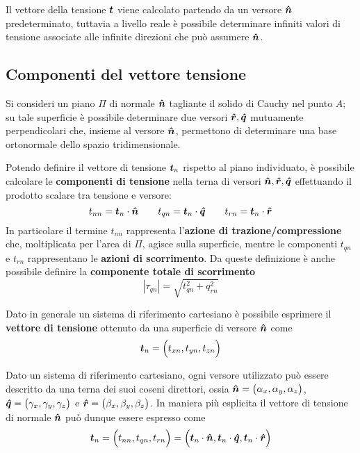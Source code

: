 	Il vettore della tensione $\boldsymbol{t}$ viene calcolato partendo da un versore $\boldsymbol{\hat{n}}$ predeterminato, tuttavia a livello reale è possibile determinare infiniti valori di tensione associate alle infinite direzioni che può assumere $\boldsymbol{\hat{n}}$.
	
	\subsection{Componenti del vettore tensione}
		Si consideri un piano $\Pi$ di normale $\boldsymbol{\hat{n}}$ tagliante il solido di Cauchy nel punto $A$; su tale superficie è possibile determinare due versori $\boldsymbol{\hat{r}}, \boldsymbol{\hat{q}}$ mutuamente perpendicolari che, insieme al versore $\boldsymbol{\hat{n}}$, permettono di determinare una base ortonormale dello spazio tridimensionale.
		
		\begin{concetto}
			Potendo definire il vettore di tensione $\boldsymbol{t}_n$ rispetto al piano individuato, è possibile calcolare le \textbf{componenti di tensione} nella terna di versori $\boldsymbol{\hat{n}}, \boldsymbol{\hat{r}}, \boldsymbol{\hat{q}}$ effettuando il prodotto scalare tra tensione e versore:
			\begin{equation} \label{eq:tens:coordinate}
				t_{nn} = \boldsymbol{t}_n \cdot \boldsymbol{\hat{n}} \qquad t_{qn} = \boldsymbol{t}_n \cdot \boldsymbol{\hat{q}} \qquad t_{rn} = \boldsymbol{t}_n \cdot \boldsymbol{\hat{r}} 
			\end{equation}
			In particolare il termine $t_{nn}$ rappresenta l'\textbf{azione di trazione/compressione} che, moltiplicata per l'area di $\Pi$, agisce sulla superficie, mentre le componenti $t_{qn}$ e $t_{rn}$ rappresentano le \textbf{azioni di scorrimento}. Da queste definizione è anche possibile definire la \textbf{componente totale di scorrimento}
			\[ |\tau_{qn}| = \sqrt{t_{qn}^2 + q_{rn}^2} \]
			
			\vspace{3mm}
			Dato in generale un sistema di riferimento cartesiano è possibile esprimere il \textbf{vettore di tensione} ottenuto da una superficie di versore $\boldsymbol{\hat{n}}$ come 
			\begin{equation}
				\boldsymbol{t}_n = \Big( t_{xn},  t_{yn}, t_{zn}\Big)
			\end{equation}
			
		\end{concetto}
		
		\begin{nota}
			Dato un sistema di riferimento cartesiano, ogni versore utilizzato può essere descritto da una terna dei suoi coseni direttori, ossia $\boldsymbol{\hat{n}} = \big(\alpha_x,\alpha_y,\alpha_z\big)$, $\boldsymbol{\hat{q}} = \big(\gamma_x, \gamma_y,\gamma_z\big)$ e $\boldsymbol{\hat{r}} = \big(\beta_x,\beta_y,\beta_z\big)$. In maniera più esplicita il vettore di tensione di normale $\boldsymbol{\hat{n}}$ può dunque essere espresso come
			\[ \boldsymbol{t}_n = \Big( t_{nn},  t_{qn}, t_{rn}\Big) = \Big( \boldsymbol{t}_n \cdot \boldsymbol{\hat{n}},  \boldsymbol{t}_n \cdot \boldsymbol{\hat{q}}, \boldsymbol{t}_n \cdot \boldsymbol{\hat{r}}\Big)  \]
		\end{nota}
		
